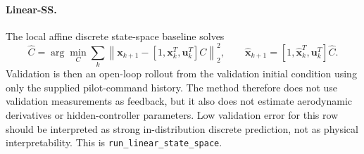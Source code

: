 \documentclass[11pt]{article}
\begin{document}
\paragraph{Linear-SS.}
The local affine discrete state-space baseline solves
\begin{equation}
    \widehat{C}
    =
    \arg\min_C
    \sum_k
    \left\|
    \mathbf{x}_{k+1}
    -
    [1,\mathbf{x}_k^T,\mathbf{u}_k^T]C
    \right\|_2^2,
    \qquad
    \hat{\mathbf{x}}_{k+1}
    =
    [1,\hat{\mathbf{x}}_k^T,\mathbf{u}_k^T]\widehat{C}.
    \label{eq:code_linear_ss}
\end{equation}
Validation is then an open-loop rollout from the validation initial condition
using only the supplied pilot-command history. The method therefore does not
use validation measurements as feedback, but it also does not estimate
aerodynamic derivatives or hidden-controller parameters. Low validation error
for this row should be interpreted as strong in-distribution discrete
prediction, not as physical interpretability. This is
\texttt{run\_linear\_state\_space}.
\end{document}
